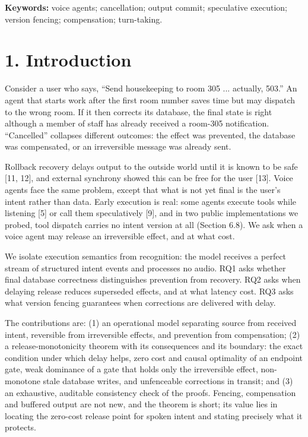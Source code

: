 \documentclass[11pt]{article}
\begin{document}
\textbf{Keywords:} voice agents; cancellation; output commit; speculative execution; version fencing; compensation; turn-taking.


\section*{1. Introduction}

Consider a user who says, ``Send housekeeping to room 305 ... actually, 503.'' An agent that starts work after the first room number saves time but may dispatch to the wrong room. If it then corrects its database, the final state is right although a member of staff has already received a room-305 notification. ``Cancelled'' collapses different outcomes: the effect was prevented, the database was compensated, or an irreversible message was already sent.


Rollback recovery delays output to the outside world until it is known to be safe [11, 12], and external synchrony showed this can be free for the user [13]. Voice agents face the same problem, except that what is not yet final is the user's intent rather than data. Early execution is real: some agents execute tools while listening [5] or call them speculatively [9], and in two public implementations we probed, tool dispatch carries no intent version at all (Section 6.8). We ask when a voice agent may release an irreversible effect, and at what cost.


We isolate execution semantics from recognition: the model receives a perfect stream of structured intent events and processes no audio. RQ1 asks whether final database correctness distinguishes prevention from recovery. RQ2 asks when delaying release reduces superseded effects, and at what latency cost. RQ3 asks what version fencing guarantees when corrections are delivered with delay.


The contributions are: (1) an operational model separating source from received intent, reversible from irreversible effects, and prevention from compensation; (2) a release-monotonicity theorem with its consequences and its boundary: the exact condition under which delay helps, zero cost and causal optimality of an endpoint gate, weak dominance of a gate that holds only the irreversible effect, non-monotone stale database writes, and unfenceable corrections in transit; and (3) an exhaustive, auditable consistency check of the proofs. Fencing, compensation and buffered output are not new, and the theorem is short; its value lies in locating the zero-cost release point for spoken intent and stating precisely what it protects.
\end{document}
